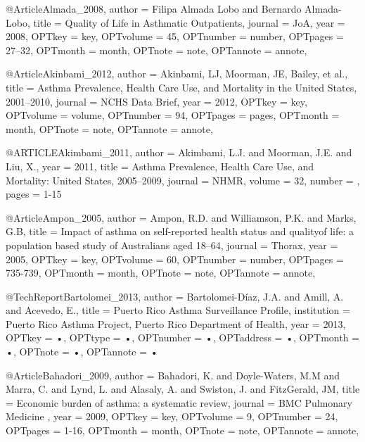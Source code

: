 @Article{Almada_2008,
author = {Filipa Almada Lobo and Bernardo Almada-Lobo},
title = {Quality of Life in Asthmatic Outpatients},
journal = {JoA},
year = {2008},
OPTkey = {key},
OPTvolume = {45},
OPTnumber = {number},
OPTpages = {27–32},
OPTmonth = {month},
OPTnote = {note},
OPTannote = {annote},
}

@Article{Akinbami_2012,
author = {Akinbami, LJ, Moorman, JE, Bailey, et al.},
title = {Asthma Prevalence, Health Care Use, and Mortality in the United States, 2001–2010},
journal = {NCHS Data Brief},
year = {2012},
OPTkey = {key},
OPTvolume = {volume},
OPTnumber = {94},
OPTpages = {pages},
OPTmonth = {month},
OPTnote = {note},
OPTannote = {annote},
}


@ARTICLE{Akimbami_2011,
  author = {Akimbami, L.J. and Moorman, J.E. and Liu, X.},
  year = {2011},
  title = {Asthma Prevalence, Health Care Use, and Mortality: United States, 2005–2009},
  journal = NHMR,
  volume =  {32},
  number = {},
  pages = {1-15}
}

@Article{Ampon_2005,
author = {Ampon, R.D. and Williamson, P.K. and Marks, G.B},
title = {Impact of asthma on self-reported health status and qualityof life: a population based study of Australians aged 18–64},
journal = {Thorax},
year = {2005},
OPTkey = {key},
OPTvolume = {60},
OPTnumber = {number},
OPTpages = {735-739},
OPTmonth = {month},
OPTnote = {note},
OPTannote = {annote},
}


@TechReport{Bartolomei_2013,
author = {Bartolomei-Díaz, J.A. and Amill, A. and Acevedo, E.},
title = {Puerto Rico Asthma Surveillance Profile},
institution = {Puerto Rico Asthma Project, Puerto Rico Department of Health},
year = {2013},
OPTkey = {•},
OPTtype = {•},
OPTnumber = {•},
OPTaddress = {•},
OPTmonth = {•},
OPTnote = {•},
OPTannote = {•}
}

@Article{Bahadori_2009,
author = {Bahadori, K. and Doyle-Waters, M.M and Marra, C. and Lynd, L. and Alasaly, A. and Swiston, J. and FitzGerald, JM},
title = {Economic burden of asthma: a systematic review},
journal = {BMC Pulmonary Medicine },
year = {2009},
OPTkey = {key},
OPTvolume = {9},
OPTnumber = {24},
OPTpages = {1-16},
OPTmonth = {month},
OPTnote = {note},
OPTannote = {annote},
}

